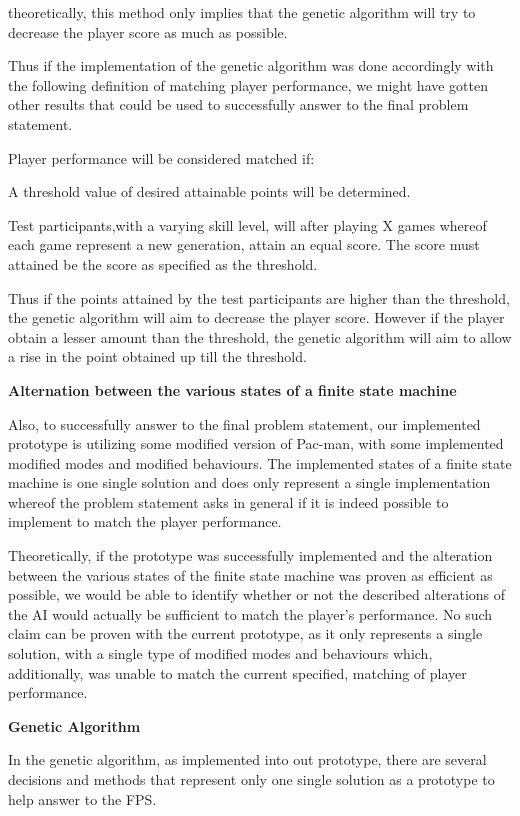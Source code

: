 theoretically, this method only implies that the genetic algorithm will try to decrease the player score as much as possible.

Thus if the implementation of the genetic algorithm was done accordingly with the following definition of matching player performance, we might have gotten other results that could be used to successfully answer to the final problem statement.

Player performance will be considered matched if:

A threshold value of desired attainable points will be determined.

Test participants,with a varying skill level, will after playing X games whereof each game represent a new generation, attain an equal score. The score must attained be the score as specified as the threshold.

 Thus if the points attained by the test participants are higher than the threshold, the genetic algorithm will aim to decrease the player score. However if the player obtain a lesser amount than the threshold, the genetic algorithm will aim to allow a rise in the point obtained up till the threshold.
 
 \textbf{Alternation between the various states of a finite state machine}
 
Also, to successfully answer to the final problem statement, our implemented prototype is utilizing some modified version of Pac-man, with some implemented modified modes and modified behaviours. The implemented states of a finite state machine is one single solution and does only represent a single implementation whereof the problem statement asks in general if it is indeed possible to implement to match the player performance.
 
Theoretically, if the prototype was successfully implemented and the alteration between the various states of the finite state machine was proven as efficient as possible, we would be able to identify whether or not the described alterations of the AI would actually be sufficient to match the player's performance. No such claim can be proven with the current prototype, as it only represents a single solution, with a single type of modified modes and behaviours which, additionally, was unable to match the current specified, matching of player performance.

\textbf{Genetic Algorithm}

In the genetic algorithm, as implemented into out prototype, there are several decisions and methods that represent only one single solution as a prototype to help answer to the FPS.


